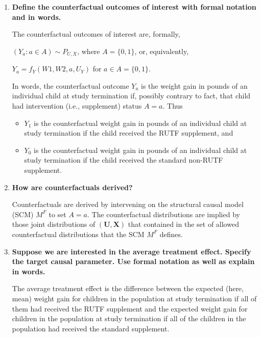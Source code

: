 \documentclass{article}\usepackage[]{graphicx}\usepackage[]{xcolor}
\begin{document}
  \begin{enumerate}[label=\textbf{\alph*.}]
  
    \item \textbf{Define the counterfactual outcomes of interest with formal notation and in words.}
    
    The counterfactual outcomes of interest are, formally, 
    
    $(Y_a : a \in A) \sim P_{U,X}$, where $A = \{0, 1\}$, or, equivalently,
    
    $Y_a = f_{Y}(W1, W2, a, U_Y)$ for $a \in A = \{0, 1\}.$
    
    In words, the counterfactual outcome $Y_a$ is the weight gain in pounds of an individual child at study termination if, possibly contrary to fact, that child had intervention (i.e., supplement) status $A = a$.  Thus
    
    \begin{itemize}
    
      \item $Y_1$ is the counterfactual weight gain in pounds of an individual child at study termination if the child received the RUTF supplement, and
      
      \item $Y_0$ is the counterfactual weight gain in pounds of an individual child at study termination if the child received the standard non-RUTF supplement.
      
    \end{itemize}

    \item \textbf{How are counterfactuals derived?}
    
    Counterfactuals are derived by intervening on the structural causal model (SCM) $M^F$ to set $A = a$. The counterfactual distributions are implied by those joint distributions of $(\bm{U}, \bm{X})$ that contained in the set of allowed counterfactual distributions that the SCM $M^F$ defines.
    
    \item \textbf{Suppose we are interested in the average treatment effect. Specify the target causal parameter. Use formal notation as well as explain in words.}
    
    The average treatment effect is the difference between the expected (here, mean) weight gain for children in the population at study termination if all of them had received the RUTF supplement and the expected weight gain for children in the population at study termination if all of the children in the population had received the standard supplement.
    

\end{enumerate}
\end{document}

